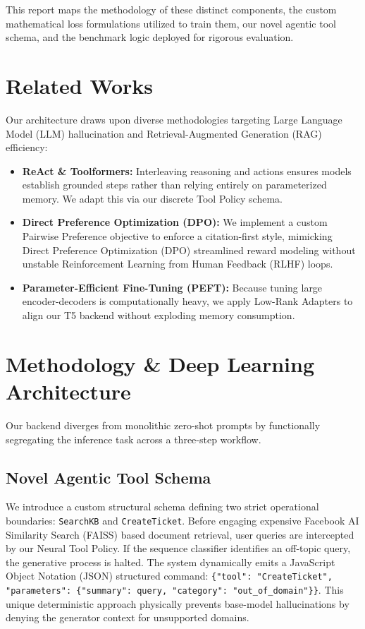 \documentclass[11pt]{article}
\begin{document}
This report maps the methodology of these distinct components, the custom mathematical loss formulations utilized to train them, our novel agentic tool schema, and the benchmark logic deployed for rigorous evaluation.

\section{Related Works}
Our architecture draws upon diverse methodologies targeting Large Language Model (LLM) hallucination and Retrieval-Augmented Generation (RAG) efficiency:
\begin{itemize}
    \item \textbf{ReAct \& Toolformers:} Interleaving reasoning and actions ensures models establish grounded steps rather than relying entirely on parameterized memory. We adapt this via our discrete Tool Policy schema.
    \item \textbf{Direct Preference Optimization (DPO):} We implement a custom Pairwise Preference objective to enforce a citation-first style, mimicking Direct Preference Optimization (DPO) streamlined reward modeling without unstable Reinforcement Learning from Human Feedback (RLHF) loops.
    \item \textbf{Parameter-Efficient Fine-Tuning (PEFT):} Because tuning large encoder-decoders is computationally heavy, we apply Low-Rank Adapters to align our T5 backend without exploding memory consumption.
\end{itemize}

\section{Methodology \& Deep Learning Architecture}
Our backend diverges from monolithic zero-shot prompts by functionally segregating the inference task across a three-step workflow.

\subsection{Novel Agentic Tool Schema}
We introduce a custom structural schema defining two strict operational boundaries: \texttt{SearchKB} and \texttt{CreateTicket}.
Before engaging expensive Facebook AI Similarity Search (FAISS) based document retrieval, user queries are intercepted by our Neural Tool Policy. If the sequence classifier identifies an off-topic query, the generative process is halted. The system dynamically emits a JavaScript Object Notation (JSON) structured command:
\texttt{\{"tool": "CreateTicket", "parameters": \{"summary": query, "category": "out\_of\_domain"\}\}}. 
This unique deterministic approach physically prevents base-model hallucinations by denying the generator context for unsupported domains.
\end{document}
